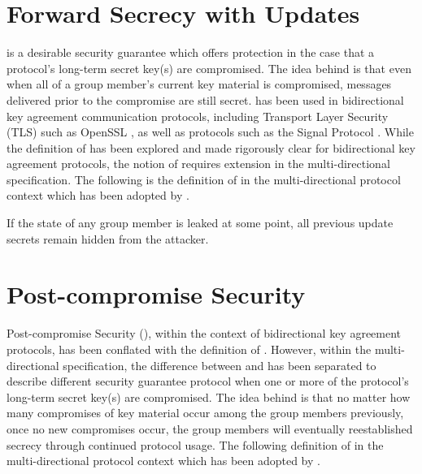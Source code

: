 \hypertarget{sec:forward-secrecy-with-updates}{%
\section{Forward Secrecy with Updates}\label{sec:forward-secrecy-with-updates}}

 is a desirable security guarantee which offers protection in the case that a protocol's long-term secret key(s) are compromised.
The idea behind  is that even when all of a group member's current key material is compromised, messages delivered prior to the compromise are still secret.
 has been used in bidirectional key agreement communication protocols, including Transport Layer Security (TLS) \autocite{rfc2246, rfc4346, rfc5246, rfc8446} such as OpenSSL \autocite{openssl}, as well as  protocols such as the Signal Protocol \autocite{cohn2020formal}.
While the definition of  has been explored and made rigorously clear for bidirectional key agreement protocols, the notion of  requires extension in the multi-directional  specification.
The following is the definition of  in the multi-directional protocol context \autocite{alwen2020security} which has been adopted by .

\begin{definition}
If the state of any group member is leaked at some point, all previous update secrets remain hidden from the attacker.
\end{definition}


\hypertarget{sec:post-compromise-security}{%
\section{Post-compromise Security}\label{sec:post-compromise-security}}

Post-compromise Security (), within the context of bidirectional key agreement protocols, has been conflated with the definition of .
However, within the multi-directional  specification, the difference between  and  has been separated to describe different security guarantee protocol when one or more of the protocol's long-term secret key(s) are compromised.
The idea behind  is that no matter how many compromises of key material occur among the group members previously, once no new compromises occur, the group members will eventually reestablished secrecy through continued protocol usage.
The following definition of  in the multi-directional protocol context \autocite{alwen2020security} which has been adopted by .

